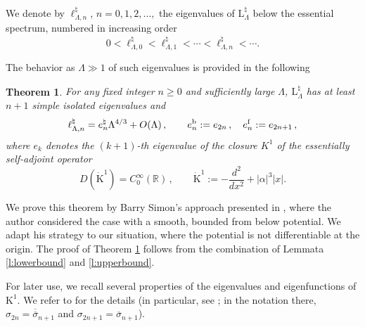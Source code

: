 \documentclass[a4paper,11pt,reqno]{amsart}
\newtheorem{theorem}{Theorem}[section]
\theoremstyle{definition}
\numberwithin{equation}{section}
\newcommand{\RE}{\mathbb R}
\newcommand{\Lrm}{\mathrm{L}}
\newcommand{\bos}{\text{\rm b}}
\newcommand{\fer}{\text{\rm f}}
\newcommand{\bosfer}{{\natural}}
\begin{document}
We denote by $\ell_{\Lambda,n}^\bosfer$, $n=0,1,2,\dots,$ the eigenvalues of $\Lrm_\Lambda^\bosfer$ below the essential spectrum, numbered in increasing order 
\[0<\ell^{\bosfer}_{\Lambda,0}<\ell^{\bosfer}_{\Lambda,1}<\cdots <\ell_{\Lambda,n}^\bosfer< \cdots. \]
\par
The behavior as $\Lambda\gg 1$ of  such eigenvalues   is provided in the following
\begin{theorem}\label{theorem_linearHam}
For any  fixed  integer $n\ge0$ and  sufficiently large $\Lambda$,  $\Lrm_\Lambda^\bosfer$ has at least $n+1$  simple isolated eigenvalues and
\begin{equation*}%
        \ell_{\Lambda,n}^\bosfer = e_{n}^{\bosfer} \Lambda^{4/3} + O(\Lambda)\,,\qquad e^{\bos}_{n}:= e_{2n}\,,\quad e_{n}^{\fer}:=e_{2n+1}\,, 
    \end{equation*}
where $e_{k}$ denotes  the $(k+1)$-th eigenvalue of the closure $K^1$ of the essentially self-adjoint operator 
\begin{equation*} %
        D( \mathrm{\dot K^1}) =C^{\infty}_{0}(\RE)\,, \qquad  \mathrm{\dot K^1} := -\frac{d^2}{dx^2}  + |\alpha|^3|x|  .
    \end{equation*}
\end{theorem}
We prove this theorem by Barry Simon's approach presented in \cite{Sim}, where the author considered the  case with a smooth, bounded from below potential. We adapt his strategy to our situation, where the potential is not differentiable at the origin. The proof of  Theorem \ref{theorem_linearHam} follows from the combination of  Lemmata \ref{l:lowerbound} and \ref{l:upperbound}.
\par
For later use, we recall several properties of the eigenvalues and eigenfunctions of  ${\mathrm{K}}^1$. We refer to \cite[Sect. 6.10]{Schwinger} for the details (in particular, see  \cite[Eqs. 6.10.9, 6.10.10,   6.9.1, 6.9.2]{Schwinger}; in the notation there, $\sigma_{2n} = \overline{\overline{\sigma}}_{n+1}$ and $\sigma_{2n+1} = \overline{\sigma}_{n+1}$).
\end{document}
